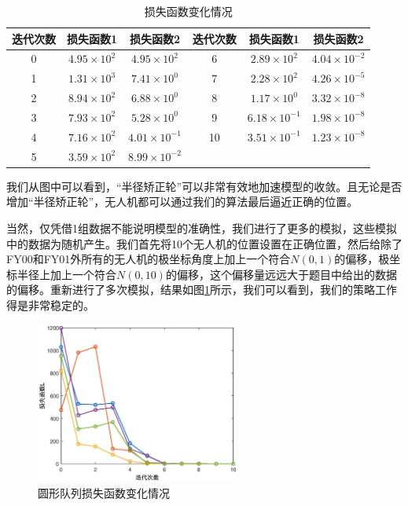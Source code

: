 \documentclass[12pt,AutoFakeSlant,AutoFakeBold]{article}
\begin{document}
\begin{table}[!ht]
    \centering
    \caption{损失函数变化情况}
    \label{tab:损失函数变化}
    \begin{tabular}{ccc|ccc}
        \toprule
        迭代次数 & 损失函数1 & 损失函数2 & 迭代次数 & 损失函数1 & 损失函数2 \\ 
        \midrule
        0 & $4.95\times 10^2$ & $4.95\times 10^2$ & 6 & $2.89\times 10^2$ & $4.04\times 10^{-2}$ \\ 
        1 & $1.31\times 10^3$ & $7.41\times 10^0$ & 7 & $2.28\times 10^2$ & $4.26\times 10^{-5}$ \\ 
        2 & $8.94\times 10^2$ & $6.88\times 10^0$ & 8 & $1.17\times 10^0$ & $3.32\times 10^{-8}$ \\ 
        3 & $7.93\times 10^2$ & $5.28\times 10^0$ & 9 & $6.18\times 10^{-1}$ & $1.98\times 10^{-8}$ \\ 
        4 & $7.16\times 10^2$ & $4.01\times 10^{-1}$ & 10 & $3.51\times 10^{-1}$ & $1.23\times 10^{-8}$ \\ 
        5 & $3.59\times 10^2$ & $8.99\times 10^{-2}$ \\ 
        \bottomrule
    \end{tabular}
\end{table}

我们从图中可以看到，“半径矫正轮”可以非常有效地加速模型的收敛。且无论是否增加“半径矫正轮”，无人机都可以通过我们的算法最后逼近正确的位置。

当然，仅凭借1组数据不能说明模型的准确性，我们进行了更多的模拟，这些模拟中的数据为随机产生。我们首先将10个无人机的位置设置在正确位置，然后给除了FY00和FY01外所有的无人机的极坐标角度上加上一个符合$N(0,1)$的偏移，极坐标半径上加上一个符合$N(0,10)$的偏移，这个偏移量远远大于题目中给出的数据的偏移。重新进行了多次模拟，结果如图\ref{fig:多次尝试}所示，我们可以看到，我们的策略工作得是非常稳定的。

\begin{figure}[!ht]
    \centering
    \includegraphics[width=0.6\textwidth]{图片/多次尝试.eps}
    \caption{圆形队列损失函数变化情况}
    \label{fig:多次尝试}
\end{figure}
\end{document}
